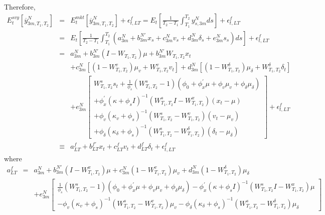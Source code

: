 \documentclass{article}
\begin{document}
Therefore,%
\begin{eqnarray*}
E_{t}^{svy}\left[ \overline{y}_{3m,T_{1},T_{2}}^{N}\right] &=&E_{t}^{mkt}%
\left[ \overline{y}_{3m,T_{1},T_{2}}^{N}\right] +\epsilon _{t,LT}^{f}=E_{t}%
\left[ \frac{1}{T_{2}-T_{1}}\int_{T_{1}}^{T_{2}}y_{s,3m}^{N}ds\right]
+\epsilon _{t,LT}^{f} \\
&=&E_{t}\left[ \frac{1}{T_{2}-T_{1}}\int_{T_{1}}^{T_{2}}\left(
a_{3m}^{N}+b_{3m}^{N\prime }x_{s}+c_{3m}^{N}v_{s}+d_{3m}^{N}\delta
_{s}+e_{3m}^{N}s_{s}\right) ds\right] +\epsilon _{t,LT}^{f} \\
&=&a_{3m}^{N}+b_{3m}^{N\prime }\left( I-W_{T_{1},T_{2}}\right) \mu
+b_{3m}^{N\prime }W_{T_{1},T_{2}}x_{t} \\
&&+c_{3m}^{N}\left[ \left( 1-W_{T_{1},T_{2}}^{v}\right) \mu
_{v}+W_{T_{1},T_{2}}^{v}v_{t}\right] +d_{3m}^{N}\left[ \left(
1-W_{T_{1},T_{2}}^{\delta }\right) \mu _{\delta }+W_{T_{1},T_{2}}^{\delta
}\delta _{t}\right] \\
&&+e_{3m}^{N}\left[ 
\begin{array}{c}
W_{T_{1},T_{2}}^{s}s_{t}+\frac{1}{\phi _{s}}\left(
W_{T_{1},T_{2}}^{s}-1\right) \left( \phi _{0}+\phi _{x}^{\prime }\mu +\phi
_{v}\mu _{v}+\phi _{\delta }\mu _{\delta }\right) \\ 
+\phi _{x}^{\prime }\left( \kappa +\phi _{s}I\right) ^{-1}\left(
W_{T_{1},T_{2}}^{s}I-W_{T_{1},T_{2}}^{x}\right) \left( x_{t}-\mu \right) \\ 
+\phi _{v}\left( \kappa _{v}+\phi _{s}\right) ^{-1}\left(
W_{T_{1},T_{2}}^{s}-W_{T_{1},T_{2}}^{v}\right) \left( v_{t}-\mu _{v}\right)
\\ 
+\phi _{\delta }\left( \kappa _{\delta }+\phi _{s}\right) ^{-1}\left(
W_{T_{1},T_{2}}^{s}-W_{T_{1},T_{2}}^{\delta }\right) \left( \delta _{t}-\mu
_{\delta }\right)%
\end{array}%
\right] +\epsilon _{t,LT}^{f} \\
&\equiv &a_{LT}^{f}+b_{LT}^{f\prime }x_{t}+c_{LT}^{f}v_{t}+d_{LT}^{f}\delta
_{t}+\epsilon _{t,LT}^{f}
\end{eqnarray*}%
where%
\begin{eqnarray*}
a_{LT}^{f} &=&a_{3m}^{N}+b_{3m}^{N\prime }\left(
I-W_{T_{1},T_{2}}^{x}\right) \mu +c_{3m}^{N}\left(
1-W_{T_{1},T_{2}}^{v}\right) \mu _{v}+d_{3m}^{N}\left(
1-W_{T_{1},T_{2}}^{\delta }\right) \mu _{\delta } \\
&&+e_{3m}^{N}\left[ 
\begin{array}{c}
\frac{1}{\phi _{s}}\left( W_{T_{1},T_{2}}^{s}-1\right) \left( \phi _{0}+\phi
_{x}^{\prime }\mu +\phi _{v}\mu _{v}+\phi _{\delta }\mu _{\delta }\right)
-\phi _{x}^{\prime }\left( \kappa +\phi _{s}I\right) ^{-1}\left(
W_{T_{1},T_{2}}^{s}I-W_{T_{1},T_{2}}^{x}\right) \mu \\ 
-\phi _{v}\left( \kappa _{v}+\phi _{s}\right) ^{-1}\left(
W_{T_{1},T_{2}}^{s}-W_{T_{1},T_{2}}^{v}\right) \mu _{v}-\phi _{\delta
}\left( \kappa _{\delta }+\phi _{s}\right) ^{-1}\left(
W_{T_{1},T_{2}}^{s}-W_{T_{1},T_{2}}^{\delta }\right) \mu _{\delta }%
\end{array}%
\right]
\end{eqnarray*}%
\end{document}

